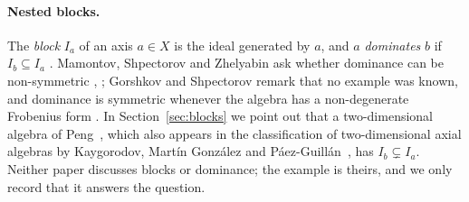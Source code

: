 \documentclass[11pt]{article}
\newif\ifwithC
\newif\ifwithB
\theoremstyle{definition}
\theoremstyle{remark}
\newcommand{\cJ}{\mathcal J}
\newcommand{\Jp}{\cJ^{+}}
\newcommand{\Jo}{\cJ^{\circ}}
\newcommand{\half}{\tfrac12}
\newcommand{\third}{\tfrac13}
\begin{document}
\paragraph{Nested blocks.}
The \emph{block} $I_a$ of an axis $a\in X$ is the ideal generated by $a$,
and $a$ \emph{dominates} $b$ if $I_b\subseteq I_a$ \cite[Defs~3.1,
3.6]{msz}. Mamontov, Shpectorov and Zhelyabin ask whether dominance can be
non-symmetric \cite[Question~9.3]{msz}, \cite[Problem~3.9]{gs}; Gorshkov and
Shpectorov remark that no example was known, and dominance is symmetric
whenever the algebra has a non-degenerate Frobenius form
\cite[Lemma~6.1]{msz}. In Section~\ref{sec:blocks} we point out that a
two-dimensional algebra of Peng~\cite{peng}, which also appears in the
classification of two-dimensional axial algebras by Kaygorodov, Mart\'in
Gonz\'alez and P\'aez-Guill\'an~\cite{kmp}, has $I_b\subsetneq I_a$. Neither
paper discusses blocks or dominance; the example is theirs, and we only
record that it answers the question.
\ifwithB
Theorem~B in Section~\ref{sec:blocks} gives one more example, for the law
$\Jp(\third)$, with a disconnected graph $\Delta(X)$.
\fi

\ifwithC
\paragraph{A decomposable block.}
An algebra is \emph{decomposable} if it is the sum of its proper ideals
\cite[Def.~3.3]{msz}. A primitive axial algebra that equals one of its
blocks is indecomposable \cite[Cor.~3.5]{msz}, and Mamontov, Shpectorov and
Zhelyabin ask whether every block is indecomposable
\cite[Question~9.2]{msz}, \cite[Problem~3.8]{gs}, noting that an ideal of a
block need not be an ideal of the whole algebra. Theorem~C in
Section~\ref{sec:block} gives, for the finite symmetric law $\Jo(\half)$ of
Table~\ref{tab:laws}, a five-dimensional primitive axial algebra $D$ whose
block $I_a$ is the sum of two proper ideals of $I_a$, one of which is not an
ideal of~$D$. This block is not generated by the axes of $X$ that it
contains; the authors of~\cite{msz} note that a block need not be an axial
algebra. If \cite[Problem~3.8]{gs} is meant only for blocks that are axial
algebras in their own right, $D$ does not answer it.
\fi
\end{document}
